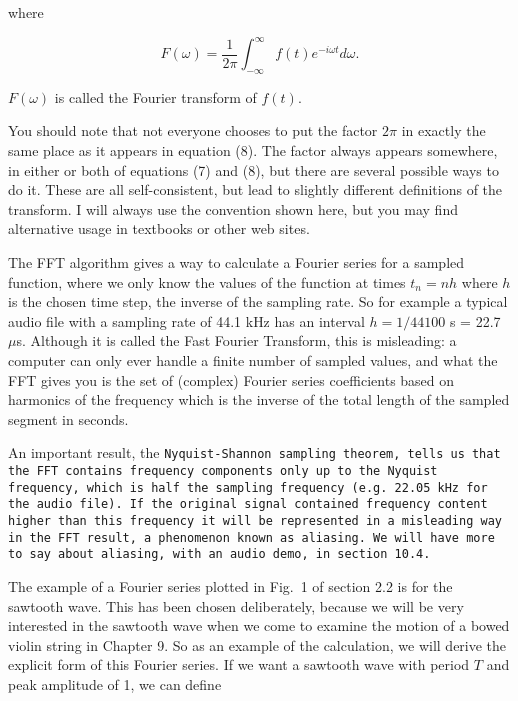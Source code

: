   \noindent{}where 

  \begin{equation*}F(\omega)=\dfrac{1}{2\pi}\int_{-\infty}^\infty f(t) e^{-i 
  \omega t} d\omega. \tag{8}\end{equation*} 

  $F(\omega)$ is called the Fourier transform of $f(t)$. 

  You should note that not everyone chooses to put the factor $2 \pi$ in 
  exactly the same place as it appears in equation (8). The factor always 
  appears somewhere, in either or both of equations (7) and (8), but there are 
  several possible ways to do it. These are all self-consistent, but lead to 
  slightly different definitions of the transform. I will always use the 
  convention shown here, but you may find alternative usage in textbooks or 
  other web sites. 

  The FFT algorithm gives a way to calculate a Fourier series for a sampled 
  function, where we only know the values of the function at times $t_n=nh$ 
  where $h$ is the chosen time step, the inverse of the sampling rate. So for 
  example a typical audio file with a sampling rate of 44.1 kHz has an interval 
  $h = 1/44100$ s = 22.7 $\mu$s. Although it is called the Fast Fourier 
  Transform, this is misleading: a computer can only ever handle a finite 
  number of sampled values, and what the FFT gives you is the set of (complex) 
  Fourier series coefficients based on harmonics of the frequency which is the 
  inverse of the total length of the sampled segment in seconds. 

  An important result, the \tt{}Nyquist-Shannon sampling theorem\rm{}, tells us 
  that the FFT contains frequency components only up to the Nyquist frequency, 
  which is half the sampling frequency (e.g. 22.05 kHz for the audio file). If 
  the original signal contained frequency content higher than this frequency it 
  will be represented in a misleading way in the FFT result, a phenomenon known 
  as aliasing. We will have more to say about aliasing, with an audio demo, in 
  section 10.4. 

  The example of a Fourier series plotted in Fig.\ 1 of section 2.2 is for the 
  sawtooth wave. This has been chosen deliberately, because we will be very 
  interested in the sawtooth wave when we come to examine the motion of a bowed 
  violin string in Chapter 9. So as an example of the calculation, we will 
  derive the explicit form of this Fourier series. If we want a sawtooth wave 
  with period $T$ and peak amplitude of 1, we can define 


